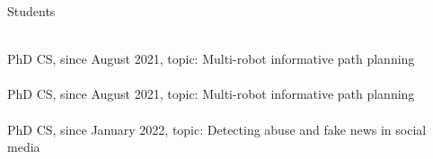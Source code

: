 \begin{category}{Students}











 \\
PhD CS, since August 2021, topic: Multi-robot informative path planning \\ %


 \\
PhD CS, since August 2021, topic: Multi-robot informative path planning \\ %

 \\
PhD CS, since January 2022, topic: Detecting abuse and fake news in social media \\ %



\end{category}

